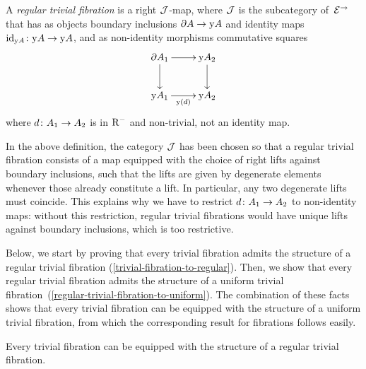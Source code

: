 \documentclass[reqno,10pt,a4paper,oneside,draft]{amsart}
\begin{document}
\begin{definition}
A \emph{regular trivial fibration} is a right $\cal{J}$-map, where $\cal{J}$ is the subcategory of~$\catE^{\to}$ that has as objects boundary inclusions $\partial A \to \yon A$ and identity maps $\id_{\yon A} \co \yon A \to \yon A$, and as non-identity morphisms commutative squares
\[
\xymatrix{
  \partial A_1
  \ar[r]
  \ar[d]
&
  \yon A_2
  \ar[d]
\\
  \yon A_1
  \ar[r]_{\yon(d)}
&
  \yon A_2
}
\]
where $d \co A_1 \to A_2$ is in $\Rm$ and non-trivial, \ie not an identity map.
\end{definition}

In the above definition, the category $\cal{J}$ has been chosen so that a regular trivial fibration consists of a 
map equipped with the choice of right lifts against boundary inclusions, such that the lifts are given by degenerate 
elements whenever those already constitute a lift. In particular, any two degenerate lifts must coincide.
This explains why we have to restrict $d \co A_1 \to A_2$ to non-identity maps: without this restriction, regular trivial fibrations would have unique lifts against boundary inclusions, which is too restrictive.


Below, we start by proving that every trivial fibration admits the structure of a regular trivial fibration (\cref{trivial-fibration-to-regular}).
Then, we show that every regular trivial fibration admits the structure of a uniform trivial  fibration~(\cref{regular-trivial-fibration-to-uniform}). The combination of these facts shows that every trivial fibration  can be equipped with the structure of a uniform trivial fibration, from which the corresponding result for fibrations follows easily.




\begin{proposition} \label{trivial-fibration-to-regular}
Every trivial fibration can be equipped with the structure of a regular trivial fibration.
\end{proposition}
\end{document}
